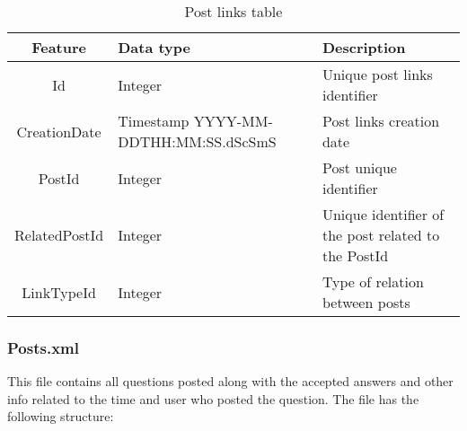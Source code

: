 \documentclass[11pt]{article} %
\begin{document}
      \begin{table}[!h]
        \begin{tabular}{|c|p{}|p{}|}
          \hline

          Feature & Data type & Description \\ \hline
          Id & Integer & Unique post links identifier \\
          CreationDate & Timestamp YYYY-MM-DDTHH:MM:SS.dScSmS & Post links creation date \\ \hline
          PostId & Integer & Post unique identifier \\ \hline
          RelatedPostId & Integer & Unique identifier of the post related to the PostId \\ \hline
          LinkTypeId & Integer & Type of relation between posts \\

          \hline
        \end{tabular}
        \caption{Post links table}
        \label{tab:postlinks}
      \end{table}

    \subsubsection{Posts.xml}

      This file contains all questions posted along with the accepted answers and other info related to the time and user who posted the question. The file has the following structure:
\end{document}
